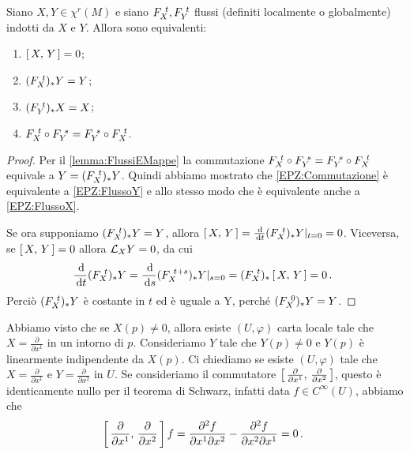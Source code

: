 \begin{proposition} \label{prop:EquivalenzaParentesiZero}
	Siano $X,Y\in\chi^r(M)$ e siano $F_{X}^{\ t},F_{Y}^{\ t}$ flussi (definiti localmente o globalmente) indotti da $X$ e $Y$. Allora sono equivalenti:
	\begin{enumerate}
	\item $\left[\,X,\,Y\,\right]=0$; \label{EPZ:ParentesiZero}
	\item $(F_{X}^{\ t})_*Y=Y$; \label{EPZ:FlussoY}
	\item $(F_{Y}^{\ t})_*X=X$; \label{EPZ:FlussoX}
	\item $F_{X}^{\ t}\circ F_{Y}^{\ s}=F_{Y}^{\ s}\circ F_{X}^{\ t}$. \label{EPZ:Commutazione}
	\end{enumerate}
\end{proposition}

\begin{proof} %
	Per il \cref{lemma:FlussiEMappe} la commutazione $F_{X}^{\ t}\circ F_{Y}^{\ s}=F_{Y}^{\ s}\circ F_{X}^{\ t}$ equivale a $Y=(F_{X}^{\ t})_*Y$. Quindi abbiamo mostrato che \ref{EPZ:Commutazione} è equivalente a \ref{EPZ:FlussoY} e allo stesso modo che è equivalente anche a \ref{EPZ:FlussoX}.
	
	Se ora supponiamo $(F_{X}^{\ t})_*Y=Y$, allora $\left[\,X,\,Y\,\right]=\frac{\,\mathrm d}{\,\mathrm d t}(F_{X}^{\ t})_*Y|_{t=0}=0$. Viceversa, se $\left[\,X,\,Y\,\right]=0$ allora $\mathcal L_XY=0$, da cui
	\begin{equation*}
		\frac{\,\mathrm d}{\,\mathrm d t}(F_{X}^{\ t})_*Y=\frac{\,\mathrm d}{\,\mathrm d s}(F_{X}^{\ t+s})_*Y|_{s=0}=(F_{X}^{\ t})_*\left[\,X,\,Y\,\right]=0\, \text{. }
	\end{equation*}
	Perciò  $(F_{X}^{\ t})_*Y$ è costante in $t$ ed è uguale a Y, perché $(F_{X}^{\ 0})_*Y=Y$.
\end{proof}

Abbiamo visto che se $X(p)\ne 0$, allora esiste $(U,\varphi)$ carta locale tale che $X=\frac{\partial}{\partial x^1}$ in un intorno di $p$. Consideriamo $Y$ tale che $Y(p)\neq 0$ e $Y(p)$ è linearmente indipendente da $X(p)$. Ci chiediamo se esiste $(U,\varphi)$ tale che $X=\frac{\partial}{\partial x^1}$ e $Y=\frac{\partial}{\partial x^2}$ in $U$. Se consideriamo il commutatore $\left[\,\frac{\partial}{\partial x^1},\,\frac{\partial}{\partial x^2}\,\right]$, questo è identicamente nullo per il teorema di Schwarz, infatti data $f\in C^\infty(U)$, abbiamo che
\begin{equation*}
	\left[\,\frac{\partial}{\partial x^1},\,\frac{\partial}{\partial x^2}\,\right]f=\frac{\partial^2f}{\partial x^1\partial x^2}-\frac{\partial^2f}{\partial x^2\partial x^1}=0\, \text{. }
\end{equation*}

